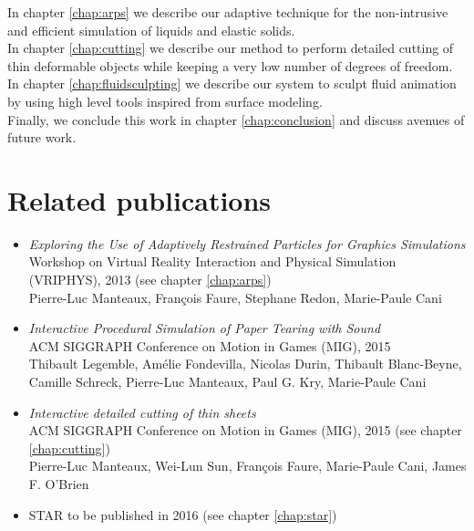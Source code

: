 In chapter \ref{chap:arps} we describe our adaptive technique for the non-intrusive and efficient simulation of liquids and elastic solids. \\

In chapter \ref{chap:cutting} we describe our method to perform detailed cutting of thin deformable objects while keeping a very low number of degrees of freedom.  \\

In chapter \ref{chap:fluidsculpting} we describe our system to sculpt fluid animation by using high level tools inspired from surface modeling. \\

Finally, we conclude this work in chapter \ref{chap:conclusion} and discuss avenues of future work.

\section{Related publications}
\begin{itemize}
    \item \cite{Manteaux2013} \emph{Exploring the Use of Adaptively Restrained Particles for Graphics Simulations} \\
    Workshop on Virtual Reality Interaction and Physical Simulation (VRIPHYS), 2013 (see chapter \ref{chap:arps})\\
    Pierre-Luc Manteaux, François Faure, Stephane Redon, Marie-Paule Cani
    \item \cite{Lejemble2015} \emph{Interactive Procedural Simulation of Paper Tearing with Sound} \\
    ACM SIGGRAPH Conference on Motion in Games (MIG), 2015 \\
    Thibault Legemble, Amélie Fondevilla, Nicolas Durin, Thibault Blanc-Beyne, Camille Schreck, Pierre-Luc Manteaux, Paul G. Kry, Marie-Paule Cani
    \item \cite{Manteaux2015} \emph{Interactive detailed cutting of thin sheets} \\
        ACM SIGGRAPH Conference on Motion in Games (MIG), 2015 (see chapter \ref{chap:cutting})\\
        Pierre-Luc Manteaux, Wei-Lun Sun, François Faure, Marie-Paule Cani, James F. O'Brien
	\item STAR to be published in 2016 (see chapter \ref{chap:star})
\end{itemize}
